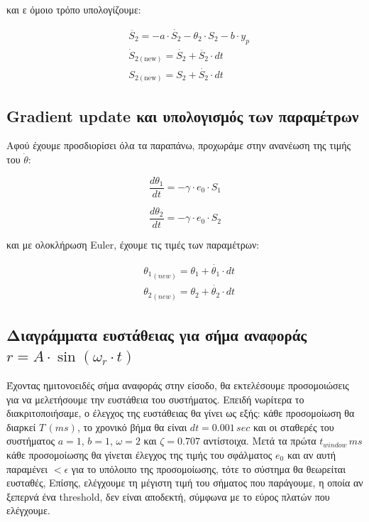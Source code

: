 \documentclass{article}
\begin{document}
\hfill\break
και ε όμοιο τρόπο υπολογίζουμε:

\begin{align*}
    & \ddot{S_2} = -a \cdot \dot{S_2} - \theta_2 \cdot S_2 - b \cdot y_p \\
    & \dot{S}_{2(\mathrm{new})} = \dot{S_2} + \ddot{S_2} \cdot dt \\
    & S_{2(\mathrm{new})} = S_2 + \dot{S_2} \cdot dt
\end{align*}

\subsection{Gradient update και υπολογισμός των παραμέτρων}
Αφού έχουμε προσδιορίσει όλα τα παραπάνω, προχωράμε στην ανανέωση της τιμής του \(\dot{\theta}\):

\begin{equation*}
    \frac{d\theta_1}{dt} = -\gamma \cdot e_0 \cdot S_1
\end{equation*}

\begin{equation*}
    \frac{d\theta_2}{dt} = -\gamma \cdot e_0 \cdot S_2
\end{equation*}

\hfill\break
και με ολοκλήρωση Euler, έχουμε τις τιμές των παραμέτρων:

\begin{align*}
    & {\theta_1}_{(new)} = \theta_1 + \dot{\theta_1} \cdot dt \\
    & {\theta_2}_{(new)} = \theta_2 + \dot{\theta_2} \cdot dt
\end{align*}

\subsection{Διαγράμματα ευστάθειας για σήμα αναφοράς \(r = A \cdot \sin(\omega_r \cdot t)\)}
Έχοντας ημιτονοειδές σήμα αναφοράς στην είσοδο, θα εκτελέσουμε προσομοιώσεις για να μελετήσουμε την ευστάθεια του συστήματος. Επειδή νωρίτερα το διακριτοποιήσαμε, ο έλεγχος της ευστάθειας θα γίνει ως εξής: κάθε προσομοίωση θα διαρκεί \(T \,(ms)\), το χρονικό βήμα θα είναι \(dt = 0.001\,sec\) και οι σταθερές του συστήματος \(a = 1\), \(b = 1\), \(\omega = 2\) και \(\zeta = 0.707\) αντίστοιχα. Μετά τα πρώτα \(t_{window}\,ms\) κάθε προσομοίωσης θα γίνεται έλεγχος της τιμής του σφάλματος \(e_0\) και αν αυτή παραμένει \(< \epsilon\) για το υπόλοιπο της προσομοίωσης, τότε το σύστημα θα θεωρείται ευσταθές, Επίσης, ελέγχουμε τη μέγιστη τιμή του σήματος που παράγουμε, η οποία αν ξεπερνά ένα threshold, δεν είναι αποδεκτή, σύμφωνα με το εύρος πλατών που ελέγχουμε.
\end{document}
